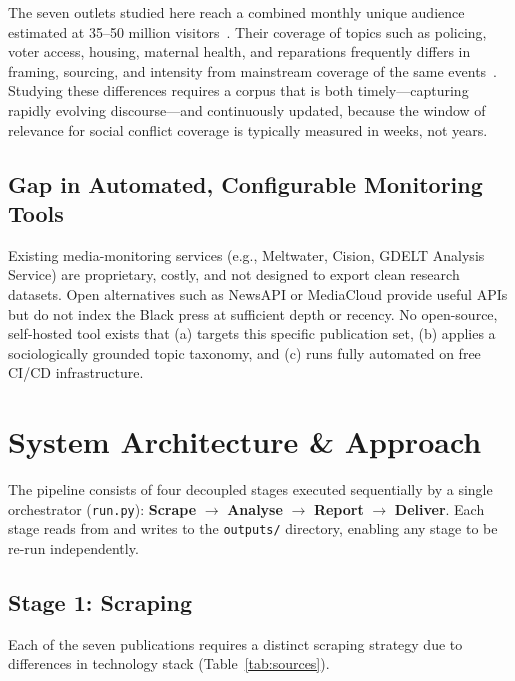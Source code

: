 \documentclass[sigconf,anonymous]{acmart}
\begin{document}
The seven outlets studied here reach a combined monthly unique audience estimated
at 35--50 million visitors~\cite{cuny2022black}.
Their coverage of topics such as policing, voter access, housing, maternal
health, and reparations frequently differs in framing, sourcing, and intensity
from mainstream coverage of the same events~\cite{mjelde2023international}.
Studying these differences requires a corpus that is both timely---capturing
rapidly evolving discourse---and continuously updated, because the window of
relevance for social conflict coverage is typically measured in weeks, not years.

\subsection{Gap in Automated, Configurable Monitoring Tools}

Existing media-monitoring services (e.g., Meltwater, Cision, GDELT Analysis
Service) are proprietary, costly, and not designed to export clean research
datasets.
Open alternatives such as NewsAPI or MediaCloud provide useful APIs but do not
index the Black press at sufficient depth or recency.
No open-source, self-hosted tool exists that (a) targets this specific
publication set, (b) applies a sociologically grounded topic taxonomy, and
(c) runs fully automated on free CI/CD infrastructure.

\section{System Architecture \& Approach}

The pipeline consists of four decoupled stages executed sequentially by a single
orchestrator (\texttt{run.py}): \textbf{Scrape} $\to$ \textbf{Analyse} $\to$
\textbf{Report} $\to$ \textbf{Deliver}.
Each stage reads from and writes to the \texttt{outputs/} directory, enabling
any stage to be re-run independently.

\subsection{Stage 1: Scraping}

Each of the seven publications requires a distinct scraping strategy due to
differences in technology stack (Table~\ref{tab:sources}).
\end{document}
